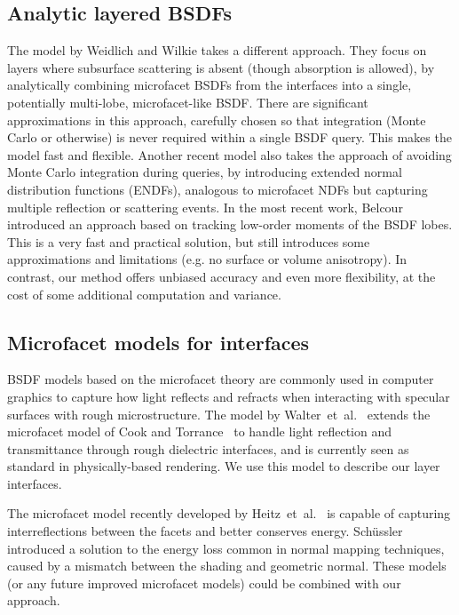 \subsection{Analytic layered BSDFs}
The model by Weidlich and Wilkie  takes a different approach. They focus on layers where subsurface scattering is absent (though absorption is allowed), by analytically combining microfacet BSDFs from the interfaces into a single, potentially multi-lobe, microfacet-like BSDF. There are significant approximations in this approach, carefully chosen so that integration (Monte Carlo or otherwise) is never required within a single BSDF query. This makes the model fast and flexible. Another recent model \cite{guo2017rendering} also takes the approach of avoiding Monte Carlo integration during queries, by introducing extended normal distribution functions (ENDFs), analogous to microfacet NDFs but capturing multiple reflection or scattering events. In the most recent work, Belcour  introduced an approach based on tracking low-order moments of the BSDF lobes. This is a very fast and practical solution, but still introduces some approximations and limitations (e.g. no surface or volume anisotropy). In contrast, our method offers unbiased accuracy and even more flexibility, at the cost of some additional computation and variance. 

\subsection{Microfacet models for interfaces}
BSDF models based on the microfacet theory are commonly used in computer graphics to capture how light reflects and refracts when interacting with specular surfaces with rough microstructure. The model by Walter~et~al.~ extends the microfacet model of Cook and Torrance~ to handle light reflection and transmittance through rough dielectric interfaces, and is currently seen as standard in physically-based rendering. We use this model to describe our layer interfaces.

The microfacet model recently developed by Heitz~et~al.~ is capable of capturing interreflections between the facets and better conserves energy. Sch\"ussler  introduced a solution to the energy loss common in normal mapping techniques, caused by a mismatch between the shading and geometric normal. These models (or any future improved microfacet models) could be combined with our approach.


